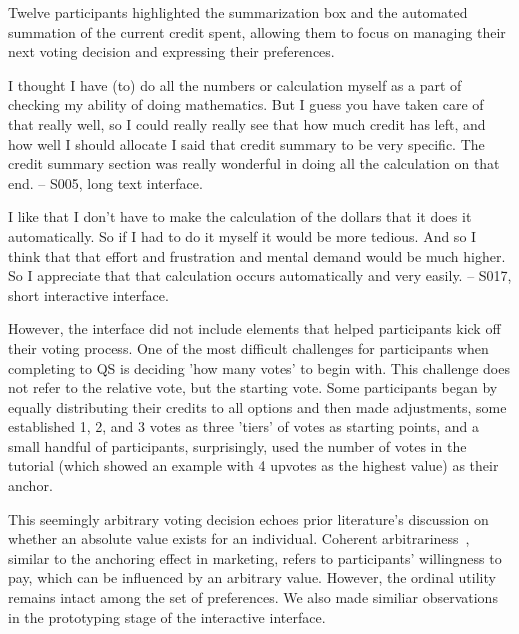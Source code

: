 Twelve participants highlighted the summarization box and the automated summation of the current credit spent, allowing them to focus on managing their next voting decision and expressing their preferences.

\begin{displayquote}
I thought I have \bracketellipsis (to) do all the numbers or calculation myself as a part of checking my ability of doing mathematics. But I guess you have taken care of that really well, so I could really really see that how much credit has left, and \bracketellipsis how well I should allocate \bracketellipsis I said that credit summary to be very specific. The credit summary section was really wonderful in doing all the calculation on that end.
\noindent \hfill -- S005, long text interface.
\end{displayquote}

\begin{displayquote}
I like that I don't have to make the calculation of the dollars that it does it automatically. So if I had to do it myself it would be more tedious. And so I think that that effort and frustration and mental demand would be much higher. So I appreciate that that calculation occurs automatically and very easily.
\noindent \hfill -- S017, short interactive interface.
\end{displayquote}

However, the interface did not include elements that helped participants kick off their voting process. One of the most difficult challenges for participants when completing to QS is deciding 'how many votes' to begin with. This challenge does not refer to the relative vote, but the starting vote. Some participants began by equally distributing their credits to all options and then made adjustments, some established 1, 2, and 3 votes as three 'tiers' of votes as starting points, and a small handful of participants, surprisingly, used the number of votes in the tutorial (which showed an example with 4 upvotes as the highest value) as their anchor.

This seemingly arbitrary voting decision echoes prior literature's discussion on whether an absolute value exists for an individual. Coherent arbitrariness~\cite{arielyCoherentArbitrarinessStable2003}, similar to the anchoring effect in marketing, refers to participants' willingness to pay, which can be influenced by an arbitrary value. However, the ordinal utility remains intact among the set of preferences. We also made similiar observations in the prototyping stage of the interactive interface.

